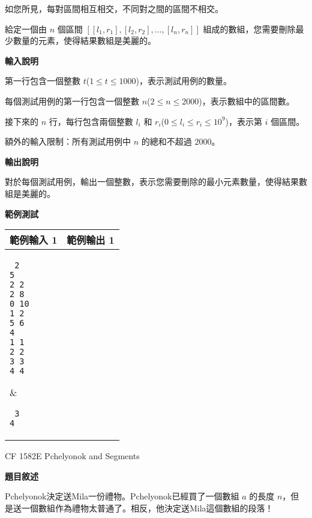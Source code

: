     如您所見，每對區間相互相交，不同對之間的區間不相交。
    
    給定一個由 $n$ 個區間 $[[l_1,r_1],[l_2,r_2],\ldots,[l_n,r_n]]$ 組成的數組，您需要刪除最少數量的元素，使得結果數組是美麗的。

    \textbf{輸入說明}

    第一行包含一個整數 $t$($1 \leq t \leq 1000$)，表示測試用例的數量。
    
    每個測試用例的第一行包含一個整數 $n$($2 \leq n \leq 2000$)，表示數組中的區間數。
    
    接下來的 $n$ 行，每行包含兩個整數 $l_i$ 和 $r_i$($0 \leq l_i \leq r_i \leq 10^9$)，表示第 $i$ 個區間。

    額外的輸入限制：所有測試用例中 $n$ 的總和不超過 $2000$。

    \textbf{輸出說明}

    對於每個測試用例，輸出一個整數，表示您需要刪除的最小元素數量，使得結果數組是美麗的。
    
    \textbf{範例測試}

    \begin{tabular}{|m{7cm}|m{7cm}|}
        \hline
        範例輸入 1 & 範例輸出 1 \\
        \hline
        \parbox[t]{7cm} %
        { \tt
        2 \\
        5 \\
        2 2 \\
        2 8 \\
        0 10 \\
        1 2 \\
        5 6 \\
        4 \\
        1 1 \\ 
        2 2 \\
        3 3 \\ 
        4 4 \\ 
        } &
        \parbox[t]{7cm}
        { \tt
        3 \\
        4 \\
        } \\
        \hline
    \end{tabular}

    \problem CF 1582E Pchelyonok and Segments

    \textbf{題目敘述}

    Pchelyonok決定送Mila一份禮物。Pchelyonok已經買了一個數組 $a$ 的長度 $n$，但是送一個數組作為禮物太普通了。相反，他決定送Mila這個數組的段落！

